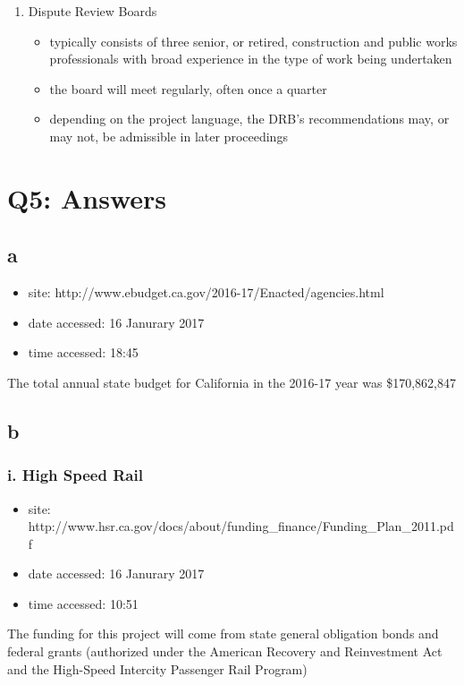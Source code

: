 \documentclass[12pt]{article} %
\begin{document}
\begin{enumerate}
\begin{itemize}
					\end{itemize}
				\item Dispute Review Boards
					\begin{itemize}
						\item typically consists of three senior, or retired, construction and public works professionals with broad experience in the type of work being undertaken
						\item the board will meet regularly, often once a quarter
						\item depending on the project language, the DRB's recommendations may, or may not, be admissible in later proceedings
					\end{itemize}
			\end{enumerate}


\section{Q5: Answers}

	\subsection{a}
		\begin{itemize}
			\item site: http://www.ebudget.ca.gov/2016-17/Enacted/agencies.html 
			\item date accessed: 16 Janurary 2017
			\item time accessed: 18:45 
		\end{itemize}
		The total annual state budget for California in the 2016-17 year was \$170,862,847
	\subsection{b}
	
		\subsubsection{i. High Speed Rail}
			\begin{itemize}
				\item site: http://www.hsr.ca.gov/docs/about/funding\_finance/Funding\_Plan\_2011.pdf
				\item date accessed: 16 Janurary 2017
				\item time accessed: 10:51
			\end{itemize}
		
			The funding for this project will come from state general obligation bonds and federal grants (authorized under the American Recovery and Reinvestment Act and the High-Speed Intercity Passenger Rail Program)
			
\end{document}
